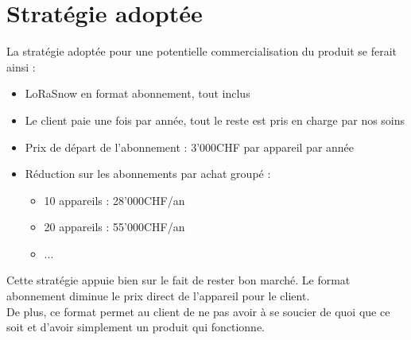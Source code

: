 \section{Stratégie adoptée}
La stratégie adoptée pour une potentielle commercialisation du produit se ferait ainsi :
\begin{itemize}
    \item LoRaSnow en format abonnement, tout inclus
    \item Le client paie une fois par année, tout le reste est pris en charge par nos soins
    \item Prix de départ de l'abonnement : 3'000CHF par appareil par année
    \item Réduction sur les abonnements par achat groupé :
    \begin{itemize}
        \item 10 appareils : 28'000CHF/an
        \item 20 appareils : 55'000CHF/an
        \item ...
    \end{itemize}
\end{itemize}
\noindent
Cette stratégie appuie bien sur le fait de rester bon marché. Le format abonnement
diminue le prix direct de l'appareil pour le client.\\
De plus, ce format permet au client de ne pas avoir à se soucier de quoi que ce soit et d'avoir
simplement un produit qui fonctionne.